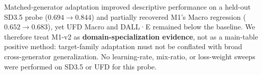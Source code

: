 Matched-generator adaptation improved descriptive performance on a held-out SD3.5 probe ($0.694\rightarrow0.844$) and partially recovered M1's Macro regression ($0.652\rightarrow0.683$), yet UFD Macro and DALL·E remained below the baseline.
We therefore treat M1-v2 as \textbf{domain-specialization evidence}, not as a main-table positive method: target-family adaptation must not be conflated with broad cross-generator generalization.
No learning-rate, mix-ratio, or loss-weight sweeps were performed on SD3.5 or UFD for this probe.
